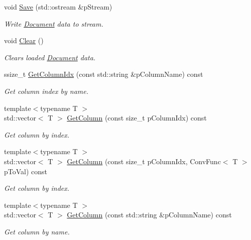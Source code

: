 \begin{DoxyCompactItemize}
void \hyperlink{classrapidcsv_1_1Document_ab0f3254e4cbe582c37395b81f5306e80}{Save} (std\+::ostream \&p\+Stream)
\begin{DoxyCompactList}\small\item\em Write \hyperlink{classrapidcsv_1_1Document}{Document} data to stream. \end{DoxyCompactList}\item 
\mbox{\label{classrapidcsv_1_1Document_a3ba6776a6490dc1a276a2767c5164f24}} 
void \hyperlink{classrapidcsv_1_1Document_a3ba6776a6490dc1a276a2767c5164f24}{Clear} ()
\begin{DoxyCompactList}\small\item\em Clears loaded \hyperlink{classrapidcsv_1_1Document}{Document} data. \end{DoxyCompactList}\item 
ssize\+\_\+t \hyperlink{classrapidcsv_1_1Document_a097839da89b8be79bbd0a346a0bb7509}{Get\+Column\+Idx} (const std\+::string \&p\+Column\+Name) const
\begin{DoxyCompactList}\small\item\em Get column index by name. \end{DoxyCompactList}\item 
{\footnotesize template$<$typename T $>$ }\\std\+::vector$<$ T $>$ \hyperlink{classrapidcsv_1_1Document_a59e6b2b71efa630b0be8c55d349fb0b8}{Get\+Column} (const size\+\_\+t p\+Column\+Idx) const
\begin{DoxyCompactList}\small\item\em Get column by index. \end{DoxyCompactList}\item 
{\footnotesize template$<$typename T $>$ }\\std\+::vector$<$ T $>$ \hyperlink{classrapidcsv_1_1Document_af1aa3f4dcbcd2513522465369584cd75}{Get\+Column} (const size\+\_\+t p\+Column\+Idx, Conv\+Func$<$ T $>$ p\+To\+Val) const
\begin{DoxyCompactList}\small\item\em Get column by index. \end{DoxyCompactList}\item 
{\footnotesize template$<$typename T $>$ }\\std\+::vector$<$ T $>$ \hyperlink{classrapidcsv_1_1Document_a58380ae48f70f6e7110a905b45fea229}{Get\+Column} (const std\+::string \&p\+Column\+Name) const
\begin{DoxyCompactList}\small\item\em Get column by name. \end{DoxyCompactList}\item 

\end{DoxyCompactItemize}
